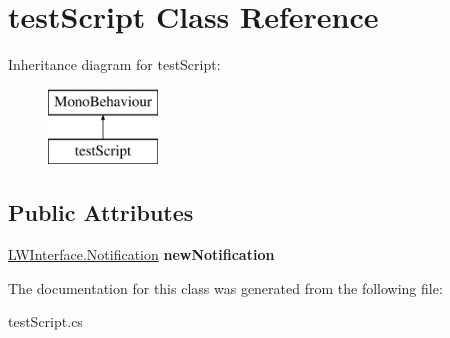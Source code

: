 \hypertarget{classtest_script}{}\section{test\+Script Class Reference}
\label{classtest_script}
Inheritance diagram for test\+Script\+:\begin{figure}[H]
\begin{center}
\leavevmode
\includegraphics[height=2.000000cm]{classtest_script}
\end{center}
\end{figure}
\subsection*{Public Attributes}
\begin{DoxyCompactItemize}
\item 
\hypertarget{classtest_script_a87ee594bfc325ad5f1029d26418a6e59}{}\hyperlink{class_live_world_1_1_l_w_interface_1_1_notification}{L\+W\+Interface.\+Notification} {\bfseries new\+Notification}\label{classtest_script_a87ee594bfc325ad5f1029d26418a6e59}

\end{DoxyCompactItemize}


The documentation for this class was generated from the following file\+:\begin{DoxyCompactItemize}
\item 
test\+Script.\+cs\end{DoxyCompactItemize}

